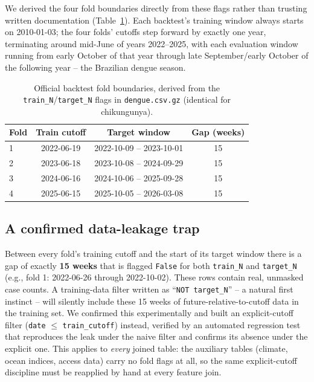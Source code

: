 \documentclass[11pt]{report}
\begin{document}
We derived the four fold boundaries directly from these flags rather than trusting written documentation (Table~\ref{tab:folds}). Each backtest's training window always starts on 2010-01-03; the four folds' cutoffs step forward by exactly one year, terminating around mid-June of years 2022--2025, with each evaluation window running from early October of that year through late September/early October of the following year -- the Brazilian dengue season.

\begin{table}[htbp]
\centering
\begin{tabular}{@{}lccc@{}}
\toprule
\textbf{Fold} & \textbf{Train cutoff} & \textbf{Target window} & \textbf{Gap (weeks)} \\
\midrule
1 & 2022-06-19 & 2022-10-09 -- 2023-10-01 & 15 \\
2 & 2023-06-18 & 2023-10-08 -- 2024-09-29 & 15 \\
3 & 2024-06-16 & 2024-10-06 -- 2025-09-28 & 15 \\
4 & 2025-06-15 & 2025-10-05 -- 2026-03-08 & 15 \\
\bottomrule
\end{tabular}
\caption{Official backtest fold boundaries, derived from the \texttt{train\_N}/\texttt{target\_N} flags in \texttt{dengue.csv.gz} (identical for chikungunya).}
\label{tab:folds}
\end{table}

\subsection*{A confirmed data-leakage trap}
Between every fold's training cutoff and the start of its target window there is a gap of exactly \textbf{15 weeks} that is flagged \texttt{False} for both \texttt{train\_N} and \texttt{target\_N} (e.g., fold 1: 2022-06-26 through 2022-10-02). These rows contain real, unmasked case counts. A training-data filter written as ``\texttt{NOT target\_N}'' -- a natural first instinct -- will silently include these 15 weeks of future-relative-to-cutoff data in the training set. We confirmed this experimentally and built an explicit-cutoff filter (\texttt{date} $\leq$ \texttt{train\_cutoff}) instead, verified by an automated regression test that reproduces the leak under the naive filter and confirms its absence under the explicit one. This applies to \emph{every} joined table: the auxiliary tables (climate, ocean indices, access data) carry no fold flags at all, so the same explicit-cutoff discipline must be reapplied by hand at every feature join.
\end{document}

